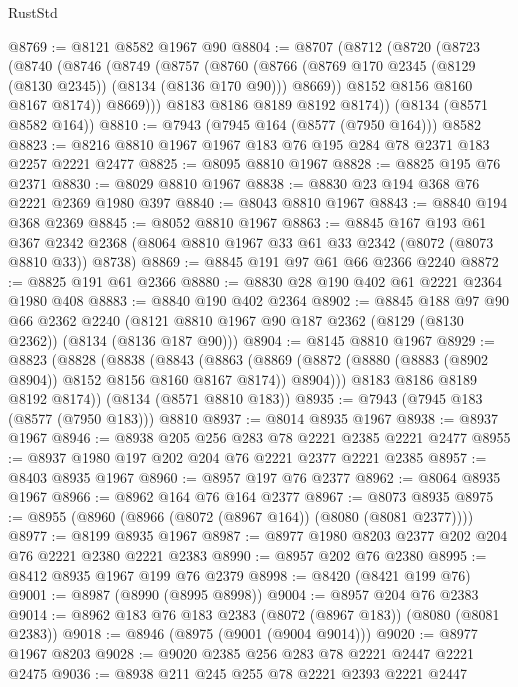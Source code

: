 \begin{lexlean}{RustStd}
\begin{coremodule}
{\begin{coremodule}
{{{{{{{{{{{{{{{{{{{{{{{{{{{{{{{{{{{{{{{{{{{{{{{{{{{{{@8769 := @8121 @8582 @1967 @90
@8804 := @8707
    (@8712
      (@8720
        (@8723
          (@8740
            (@8746
              (@8749
                (@8757
                  (@8760
                    (@8766 (@8769 @170 @2345 (@8129 (@8130 @2345)) (@8134 (@8136 @170 @90))) @8669))
                  @8152
                  @8156
                  @8160
                  @8167
                  @8174))
              @8669)))
        @8183
        @8186
        @8189
        @8192
        @8174))
    (@8134 (@8571 @8582 @164))
@8810 := @7943 (@7945 @164 (@8577 (@7950 @164))) @8582
@8823 := @8216 @8810 @1967 @1967 @183 @76 @195 @284 @78 @2371 @183 @2257 @2221 @2477
@8825 := @8095 @8810 @1967
@8828 := @8825 @195 @76 @2371
@8830 := @8029 @8810 @1967
@8838 := @8830 @23 @194 @368 @76 @2221 @2369 @1980 @397
@8840 := @8043 @8810 @1967
@8843 := @8840 @194 @368 @2369
@8845 := @8052 @8810 @1967
@8863 := @8845
    @167
    @193
    @61
    @367
    @2342
    @2368
    (@8064 @8810 @1967 @33 @61 @33 @2342 (@8072 (@8073 @8810 @33)) @8738)
@8869 := @8845 @191 @97 @61 @66 @2366 @2240
@8872 := @8825 @191 @61 @2366
@8880 := @8830 @28 @190 @402 @61 @2221 @2364 @1980 @408
@8883 := @8840 @190 @402 @2364
@8902 := @8845
    @188
    @97
    @90
    @66
    @2362
    @2240
    (@8121 @8810 @1967 @90 @187 @2362 (@8129 (@8130 @2362)) (@8134 (@8136 @187 @90)))
@8904 := @8145 @8810 @1967
@8929 := @8823
    (@8828
      (@8838
        (@8843
          (@8863 (@8869 (@8872 (@8880 (@8883 (@8902 @8904)) @8152 @8156 @8160 @8167 @8174)) @8904)))
        @8183
        @8186
        @8189
        @8192
        @8174))
    (@8134 (@8571 @8810 @183))
@8935 := @7943 (@7945 @183 (@8577 (@7950 @183))) @8810
@8937 := @8014 @8935 @1967
@8938 := @8937 @1967
@8946 := @8938 @205 @256 @283 @78 @2221 @2385 @2221 @2477
@8955 := @8937 @1980 @197 @202 @204 @76 @2221 @2377 @2221 @2385
@8957 := @8403 @8935 @1967
@8960 := @8957 @197 @76 @2377
@8962 := @8064 @8935 @1967
@8966 := @8962 @164 @76 @164 @2377
@8967 := @8073 @8935
@8975 := @8955 (@8960 (@8966 (@8072 (@8967 @164)) (@8080 (@8081 @2377))))
@8977 := @8199 @8935 @1967
@8987 := @8977 @1980 @8203 @2377 @202 @204 @76 @2221 @2380 @2221 @2383
@8990 := @8957 @202 @76 @2380
@8995 := @8412 @8935 @1967 @199 @76 @2379
@8998 := @8420 (@8421 @199 @76)
@9001 := @8987 (@8990 (@8995 @8998))
@9004 := @8957 @204 @76 @2383
@9014 := @8962 @183 @76 @183 @2383 (@8072 (@8967 @183)) (@8080 (@8081 @2383))
@9018 := @8946 (@8975 (@9001 (@9004 @9014)))
@9020 := @8977 @1967 @8203
@9028 := @9020 @2385 @256 @283 @78 @2221 @2447 @2221 @2475
@9036 := @8938 @211 @245 @255 @78 @2221 @2393 @2221 @2447
}}}}}}}}}}}}}}}}}}}}}}}}}}}}}}}}}}}}}}}}}}}}}}}}}}}}}
\end{coremodule}}
\end{coremodule}
\end{lexlean}
